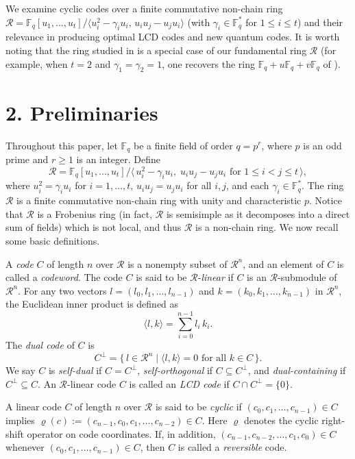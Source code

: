 \documentclass[12pt]{article}
\begin{document}
We examine cyclic codes over a finite commutative non-chain ring
$\mathcal{R} = \mathbb{F}_q[u_1,\ldots,u_t]/\langle u_i^2 - \gamma_i u_i,\, u_i u_j - u_j u_i\rangle$
(with $\gamma_i \in \mathbb{F}_q^*$ for $1 \le i \le t$) and their relevance in producing optimal LCD codes and new quantum codes. It is worth noting that the ring studied in \cite{21} is a special case of our fundamental ring $\mathcal{R}$ (for example, when $t=2$ and $\gamma_1 = \gamma_2 = 1$, one recovers the ring $\mathbb{F}_q + u\mathbb{F}_q + v\mathbb{F}_q$ of \cite{21}).

\section*{2. Preliminaries}
Throughout this paper, let $\mathbb{F}_q$ be a finite field of order $q = p^r$, where $p$ is an odd prime and $r \ge 1$ is an integer. Define 
\[
\mathcal{R} = \mathbb{F}_q[u_1,\ldots,u_t] \Big/ \Big\langle\, u_i^2 - \gamma_i u_i,\; u_i u_j - u_j u_i \text{ for } 1 \le i < j \le t\,\Big\rangle,
\] 
where $u_i^2 = \gamma_i u_i$ for $i=1,\ldots,t$, $u_i u_j = u_j u_i$ for all $i,j$, and each $\gamma_i \in \mathbb{F}_q^*$. The ring $\mathcal{R}$ is a finite commutative non-chain ring with unity and characteristic $p$. Notice that $\mathcal{R}$ is a Frobenius ring (in fact, $\mathcal{R}$ is semisimple as it decomposes into a direct sum of fields) which is not local, and thus $\mathcal{R}$ is a non-chain ring. We now recall some basic definitions.

A \textit{code} $C$ of length $n$ over $\mathcal{R}$ is a nonempty subset of $\mathcal{R}^n$, and an element of $C$ is called a \textit{codeword}. The code $C$ is said to be $\mathcal{R}$-\textit{linear} if $C$ is an $\mathcal{R}$-submodule of $\mathcal{R}^n$. For any two vectors $l = (l_0, l_1, \ldots, l_{n-1})$ and $k = (k_0, k_1, \ldots, k_{n-1})$ in $\mathcal{R}^n$, the Euclidean inner product is defined as
\[
\langle l, k \rangle = \sum_{i=0}^{n-1} l_i\, k_i.
\]
The \textit{dual code} of $C$ is 
\[
C^{\perp} = \{\, l \in \mathcal{R}^n \mid \langle l, k \rangle = 0 \text{ for all } k \in C \,\}.
\]
We say $C$ is \textit{self-dual} if $C = C^{\perp}$, \textit{self-orthogonal} if $C \subseteq C^{\perp}$, and \textit{dual-containing} if $C^{\perp} \subseteq C$. An $\mathcal{R}$-linear code $C$ is called an \textit{LCD code} if $C \cap C^{\perp} = \{0\}$.

A linear code $C$ of length $n$ over $\mathcal{R}$ is said to be \textit{cyclic} if $(c_0, c_1, \ldots, c_{n-1}) \in C$ implies $\varrho(c) := (c_{n-1}, c_0, c_1, \ldots, c_{n-2}) \in C$. Here $\varrho$ denotes the cyclic right-shift operator on code coordinates. If, in addition, $(c_{n-1}, c_{n-2}, \ldots, c_1, c_0) \in C$ whenever $(c_0, c_1, \ldots, c_{n-1}) \in C$, then $C$ is called a \textit{reversible} code.
\end{document}
